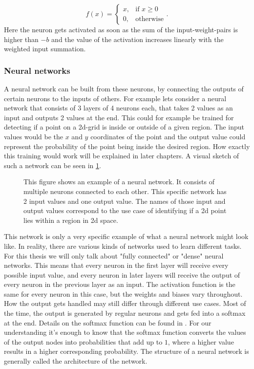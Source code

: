 \begin{equation}
	f(x) = 
	\begin{cases}
		x, &\text{if } x\geq0 \\
		0, &\text{otherwise}
	\end{cases}.
\end{equation}
Here the neuron gets activated as soon as the sum of the input-weight-pairs is higher than $-b$ and the value of the activation increases linearly with the weighted input summation.
\subsubsection{Neural networks}\label{sec:NeuralNetworks}
A neural network can be built from these neurons, by connecting the outputs of certain neurons to the inputs of others. For example lets consider a neural network that consists of 3 layers of 4 neurons each, that takes 2 values as an input and outputs 2 values at the end. This could for example be trained for detecting if a point on a 2d-grid is inside or outside of a given region. The input values would be the $x$ and $y$ coordinates of the point and the output value could represent the probability of the point being inside the desired region. How exactly this training would work will be explained in later chapters. A visual sketch of such a network can be seen in \cref{fig:Neural_network_example}. \\
\begin{figure}
	\centering
	
	\caption{This figure shows an example of a neural network. It consists of multiple neurons connected to each other. This specific network has 2 input values and one output value. The names of those input and output values correspond to the use case of identifying if a 2d point lies within a region in 2d space.}
	\label{fig:Neural_network_example}
\end{figure}
This network is only a very specific example of what a neural network might look like. In reality, there are various kinds of networks used to learn different tasks. For this thesis we will only talk about "fully connected" or "dense" neural networks. This means that every neuron in the first layer will receive every possible input value, and every neuron in later layers will receive the output of every neuron in the previous layer as an input. The activation function is the same for every neuron in this case, but the weights and biases vary throughout. How the output gets handled may still differ through different use cases. Most of the time, the output is generated by regular neurons and gets fed into a softmax at the end. Details on the softmax function can be found in \cite{gao2018properties}. For our understanding it's enough to know that the softmax function converts the values of the output nodes into probabilities that add up to $1$, where a higher value results in a higher corresponding probability. The structure of a neural network is generally called the architecture of the network. 
